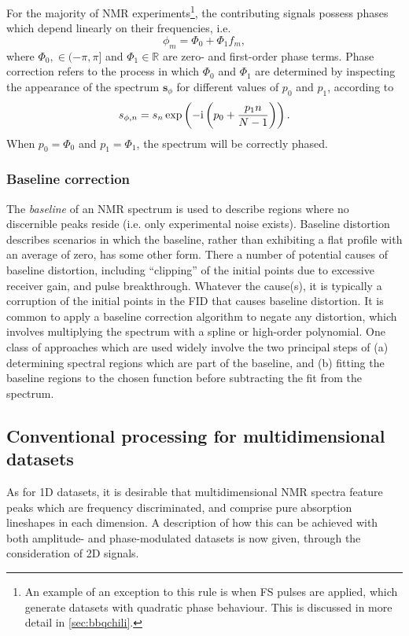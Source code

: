 For the majority of \ac{NMR} experiments\footnote{
     An example of an exception to this rule is when \acl{FS} pulses are applied,
     which generate datasets with quadratic phase behaviour. This is discussed
     in more detail in \cref{sec:bbqchili}.
}, the contributing signals possess phases which depend linearly on their
frequencies, i.e.
\begin{equation}
    \phi_m = \Phi_0 + \Phi_1 f_m,
\end{equation}
where $\Phi_0, \in (-\pi, \pi]$ and $\Phi_1 \in \mathbb{R}$ are zero- and
first-order phase terms.
Phase correction refers to the process in which $\Phi_0$ and $\Phi_1$ are
determined by inspecting the appearance of the spectrum
$\symbf{s}_{\phi}$ for different values of $p_0$ and  $p_1$, according to
\begin{equation}
    s_{\phi,n} = s_n
    \exp\left(-\mathrm{i} \left(p_0 + \frac{p_1 n}{N - 1}\right)\right).
\end{equation}
When $p_0 = \Phi_0$ and  $p_1 = \Phi_1$, the spectrum will be correctly phased.

\subsubsection{Baseline correction}
The \emph{baseline} of an \ac{NMR} spectrum is used to describe regions where
no discernible peaks reside (i.e. only experimental noise exists).
Baseline distortion describes scenarios in which the baseline, rather
than exhibiting a flat profile with an average of zero, has some other form.
There a number of potential causes of baseline distortion, including
``clipping'' of the initial points due to excessive receiver gain,
and pulse breakthrough.
Whatever the cause(s), it is typically a corruption of the initial points in
the \ac{FID} that causes baseline distortion.
It is common to apply a baseline correction algorithm to negate any distortion,
which involves multiplying the spectrum with a spline or high-order polynomial.
One class of approaches which are used widely involve the two principal steps
of (a) determining spectral regions which are part of the baseline, and (b)
fitting the baseline regions to the chosen
function before subtracting the fit from the
spectrum\cite{Dietrich1991,Cobas2006}.

\subsection{Conventional processing for multidimensional datasets}
\label{subsec:mulitdim}
As for \ac{1D} datasets, it is desirable that multidimensional \ac{NMR} spectra
feature peaks which are frequency discriminated, and comprise pure
absorption lineshapes in each dimension.
A description of how this can be achieved with both amplitude- and
phase-modulated datasets is now given, through the consideration of \ac{2D}
signals.


